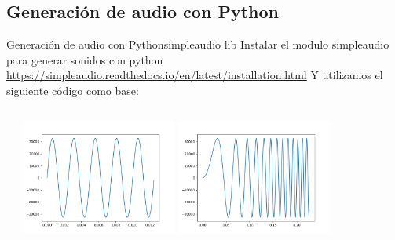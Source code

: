  \subsection{Generación de audio con Python}
 \begin{frame}[t]{Generación de audio con Python}{simpleaudio lib}
    \handsonicon
    Instalar el modulo simpleaudio para generar sonidos con python
    \tiny
       \href{https://simpleaudio.readthedocs.io/en/latest/installation.html}{https://simpleaudio.readthedocs.io/en/latest/installation.html}
    \normalsize
    Y utilizamos el siguiente código como base:
    \begin{columns}[t]
       \begin{column}{0.5\textwidth}
       
    \end{column}
       \begin{column}{0.5\textwidth}
       \center\includegraphics[width=0.4\textwidth]{2_clase/audio_gen1.png}
       \center\includegraphics[width=0.4\textwidth]{2_clase/audio_gen2.png}
    \end{column}
    \end{columns}
   \vfill
 \end{frame}
